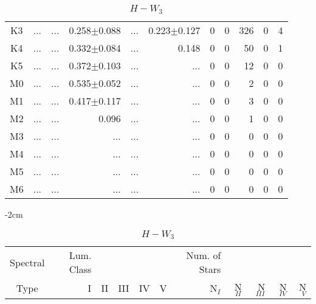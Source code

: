 \begin{table}[t]
\begin{table}[t]
\begin{center}
\begin{tabular}{c|rrrrr|rrrrr}
    K3	&	 ...	&	 ...	&	0.258$\pm$0.088	&	 ...	&	0.223$\pm$0.127	&	0	&	0	&	326	&	0	&	4	\\
    K4	&	 ...	&	 ...	&	0.332$\pm$0.084	&	 ...	&	0.148	&	0	&	0	&	50	&	0	&	1	\\
    K5	&	 ...	&	 ...	&	0.372$\pm$0.103	&	 ...	&	 ...	&	0	&	0	&	12	&	0	&	0	\\
    M0	&	 ...	&	 ...	&	0.535$\pm$0.052	&	 ...	&	 ...	&	0	&	0	&	2	&	0	&	0	\\
    M1	&	 ...	&	 ...	&	0.417$\pm$0.117	&	 ...	&	 ...	&	0	&	0	&	3	&	0	&	0	\\
    M2	&	 ...	&	 ...	&	0.096	&	 ...	&	 ...	&	0	&	0	&	1	&	0	&	0	\\
    M3	&	 ...	&	 ...	&	 ...	&	 ...	&	 ...	&	0	&	0	&	0	&	0	&	0	\\
    M4	&	 ...	&	 ...	&	 ...	&	 ...	&	 ...	&	0	&	0	&	0	&	0	&	0	\\
    M5	&	 ...	&	 ...	&	 ...	&	 ...	&	 ...	&	0	&	0	&	0	&	0	&	0	\\
    M6	&	 ...	&	 ...	&	 ...	&	 ...	&	 ...	&	0	&	0	&	0	&	0	&	0	\\
        \bottomrule
        \end{tabular}
    \end{center}
    \end{table}
    
    \begin{table}[t]
    \tiny
    \centering
    \caption{$H-W_{3}$}
    \begin{center}
        \addtolength{\leftskip} {-2cm}
        \addtolength{\rightskip}{-2cm}
        \begin{tabular}{c|rrrrr|rrrrr}
        \toprule
        Spectral & Lum. Class & & & & & Num. of Stars & & & &  \\
        Type & I & II & III &  IV & V & N$_{I}$ & N$_{II}$ & N$_{III}$ & N$_{IV}$ & N$_{V}$ \\ \midrule
      

\end{tabular}
\end{center}
\end{table}
\end{table}
